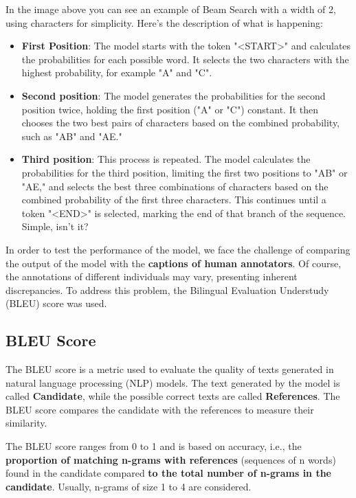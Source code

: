In the image above you can see an example of Beam Search with a width of 2, using characters for simplicity. Here's the description of what is happening:
\begin{itemize}
    \item \textbf{First Position}: The model starts with the token "<START>" and calculates the probabilities for each possible word. It selects the two characters with the highest probability, for example "A" and "C". 
    \item \textbf{Second position}: The model generates the probabilities for the second position twice, holding the first position ("A" or "C") constant. It then chooses the two best pairs of characters based on the combined probability, such as "AB" and "AE."
    \item \textbf{Third position}: This process is repeated. The model calculates the probabilities for the third position, limiting the first two positions to "AB" or "AE," and selects the best three combinations of characters based on the combined probability of the first three characters. This continues until a token "<END>" is selected, marking the end of that branch of the sequence. Simple, isn't it? 
\end{itemize}

In order to test the performance of the model, we face the challenge of comparing the output of the model with the \textbf{captions of human annotators}. Of course, the annotations of different individuals may vary, presenting inherent discrepancies. To address this problem, the Bilingual Evaluation Understudy (BLEU) score was used.

\subsection{BLEU Score}

The BLEU score is a metric used to evaluate the quality of texts generated in natural language processing (NLP) models. The text generated by the model is called \textbf{Candidate}, while the possible correct texts are called \textbf{References}. The BLEU score compares the candidate with the references to measure their similarity.

The BLEU score ranges from 0 to 1 and is based on accuracy, i.e., the \textbf{proportion of matching n-grams with references} (sequences of n words) found in the candidate compared \textbf{to the total number of n-grams in the candidate}. Usually, n-grams of size 1 to 4 are considered.


